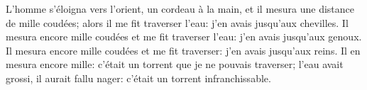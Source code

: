 L’homme s’éloigna vers l’orient, un cordeau à la main,
	et il mesura une distance de mille coudées;
	alors il me fit traverser l’eau: j’en avais jusqu’aux chevilles.
Il mesura encore mille coudées et me fit traverser l’eau: j’en avais jusqu’aux genoux.
Il mesura encore mille coudées et me fit traverser: j’en avais jusqu’aux reins.
Il en mesura encore mille: c’était un torrent que je ne pouvais traverser;
	l’eau avait grossi, il aurait fallu nager: c’était un torrent infranchissable.
